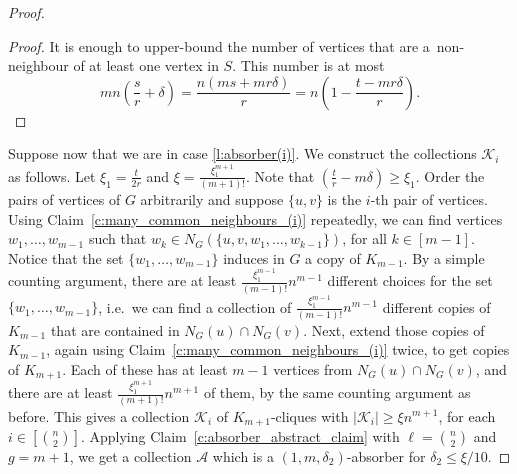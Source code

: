 \documentclass[reqno, 12pt]{amsart}
\numberwithin{equation}{section}
\numberwithin{figure}{section}
\theoremstyle{plain}
\theoremstyle{definition}
\def\cA{{\mathcal A}}
\def\cK{{\mathcal K}}
\def\nkb#1{\textcolor{violet}{#1}}
\begin{document}
\begin{proof}
        \begin{proof}
            It is enough to upper-bound the number of vertices that are a~non-neighbour of at least one vertex in $S$. This number is at most
        $$mn \left(\frac{s}{r}+\delta \right)= \frac{n(ms+mr\delta)}{r} = n\left(1-\frac{t-mr\delta}{r} \right).$$
        \end{proof}

        Suppose now that we are in case \ref{l:absorber(i)}. We construct the collections $\cK_i$ as follows. 
        Let $\xi_1=\frac{t}{2r}$ and $\xi=\frac{\xi_1^{m+1}}{(m+1)!}$. Note that $\left(\frac{t}{r}-m\delta\right)\geq \xi_1$. Order the pairs of vertices of $G$ arbitrarily and suppose $\{u,v\}$ is the $i$-th pair of vertices. Using Claim~\ref{c:many_common_neighbours_(i)} repeatedly, we can find vertices $w_1,\dots,w_{m-1}$ such that $w_k\in N_G(\{u,v,w_1,\dots,w_{k-1}\})$, for all $k\in[m-1]$. Notice that the set $\{w_1,\dots,w_{m-1}\}$ induces in $G$ a copy of $K_{m-1}$. By a simple counting argument, there are at least $\frac{\xi_1^{m-1}}{(m-1)!}n^{m-1}$ different choices for the set $\{w_1,\dots,w_{m-1}\}$, i.e.~we can find a collection of $\frac{\xi_1^{m-1}}{(m-1)!}n^{m-1}$ different copies of $K_{m-1}$ that are contained in $N_G(u)\cap N_G(v)$. 
        Next, extend those copies of $K_{m-1}$, again using Claim~\ref{c:many_common_neighbours_(i)} twice, to get copies of $K_{m+1}$. Each of these has at least $m-1$ vertices from $N_G(u)\cap N_G(v)$, and there are at least $\frac{\xi_1^{m+1}}{(m+1)!}n^{m+1}$ of them, by the same counting argument as before. This gives a collection $\cK_i$ of $K_{m+1}$-cliques with $|\cK_i|\geq \xi n^{m+1}$, for each $i\in [\binom n2]$. Applying Claim~\ref{c:absorber_abstract_claim} with $\ell={n\choose 2}$ and $g=m+1$, we get a collection $\cA$ which is a $(1,m,\delta_2)$-absorber for $\delta_2\leq \xi/10$.

     
          
          
        

\end{proof}
\end{document}

